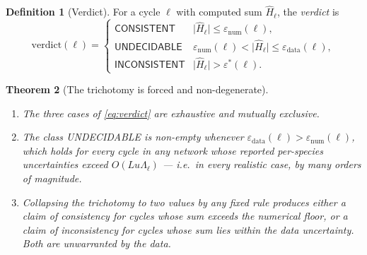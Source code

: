 \documentclass[11pt,twocolumn,a4paper]{article}
\theoremstyle{pstyle}
\newtheorem{theorem}{Theorem}[section]
\theoremstyle{definition}
\newtheorem{definition}[theorem]{Definition}
\theoremstyle{remark}
\newcommand{\abs}[1]{\lvert#1\rvert}
\newcommand{\eps}{\varepsilon}
\newcommand{\epsnum}{\eps_{\mathrm{num}}}
\newcommand{\epsdata}{\eps_{\mathrm{data}}}
\newcommand{\epsstar}{\eps^{\ast}}
\newcommand{\hol}{H}
\newcommand{\mach}{u}
\begin{document}
\begin{definition}[Verdict]
\label{def:verdict}
For a cycle $\ell$ with computed sum $\widehat{\hol}_\ell$, the
\emph{verdict} is
\begin{equation}
  \mathrm{verdict}(\ell) =
  \begin{cases}
    \textsf{CONSISTENT}   & \abs{\widehat{\hol}_\ell} \le
                            \epsnum(\ell),\\[2pt]
    \textsf{UNDECIDABLE}  & \epsnum(\ell) < \abs{\widehat{\hol}_\ell}
                            \le \epsdata(\ell),\\[2pt]
    \textsf{INCONSISTENT} & \abs{\widehat{\hol}_\ell} > \epsstar(\ell).
  \end{cases}
  \label{eq:verdict}
\end{equation}
\end{definition}

\begin{theorem}[The trichotomy is forced and non-degenerate]
\label{thm:trichotomy}
\leavevmode
\begin{enumerate}[label=(\roman*),leftmargin=2em,itemsep=2pt]
\item The three cases of \eqref{eq:verdict} are exhaustive and mutually
exclusive.
\item The class \textsf{UNDECIDABLE} is non-empty whenever
$\epsdata(\ell) > \epsnum(\ell)$, which holds for every cycle in any
network whose reported per-species uncertainties exceed
$O(L\mach\Lambda_\ell)$ --- i.e.\ in every realistic case, by many
orders of magnitude.
\item Collapsing the trichotomy to two values by any fixed rule produces
either a claim of consistency for cycles whose sum exceeds the numerical
floor, or a claim of inconsistency for cycles whose sum lies within the
data uncertainty. Both are unwarranted by the data.
\end{enumerate}
\end{theorem}
\end{document}
